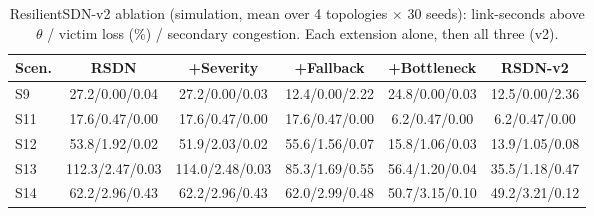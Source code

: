 \begin{table}[t]\centering\scriptsize
\caption{ResilientSDN-v2 ablation (simulation, mean over 4 topologies $\times$ 30 seeds): link-seconds above $\theta$ / victim loss (\%) / secondary congestion. Each extension alone, then all three (v2).}
\label{tab:ablation_v2}
\setlength{\tabcolsep}{2pt}
\begin{tabular}{lccccc}
\toprule
Scen. & RSDN & +Severity & +Fallback & +Bottleneck & RSDN-v2\\
\midrule
S9 & 27.2/0.00/0.04 & 27.2/0.00/0.03 & 12.4/0.00/2.22 & 24.8/0.00/0.03 & 12.5/0.00/2.36\\
S11 & 17.6/0.47/0.00 & 17.6/0.47/0.00 & 17.6/0.47/0.00 & 6.2/0.47/0.00 & 6.2/0.47/0.00\\
S12 & 53.8/1.92/0.02 & 51.9/2.03/0.02 & 55.6/1.56/0.07 & 15.8/1.06/0.03 & 13.9/1.05/0.08\\
S13 & 112.3/2.47/0.03 & 114.0/2.48/0.03 & 85.3/1.69/0.55 & 56.4/1.20/0.04 & 35.5/1.18/0.47\\
S14 & 62.2/2.96/0.43 & 62.2/2.96/0.43 & 62.0/2.99/0.48 & 50.7/3.15/0.10 & 49.2/3.21/0.12\\
\bottomrule
\end{tabular}
\end{table}
